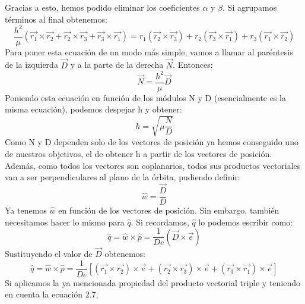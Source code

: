 \documentclass{article}
\numberwithin{equation}{section}
\begin{document}
Gracias a esto, hemos podido eliminar los coeficientes 
$\alpha$ y $\beta$. Si agrupamos términos al final obtenemos: 
\begin{equation*}
    \frac{h^{2}}{\mu}(\overrightarrow{r_{1}}\times\overrightarrow{r_{2}}+\overrightarrow{r_{2}}\times\overrightarrow{r_{3}}+\overrightarrow{r_{3}}\times\overrightarrow{r_{1}})=r_{1}(\overrightarrow{r_{2}}\times\overrightarrow{r_{3}})+r_{2}(\overrightarrow{r_{3}}\times\overrightarrow{r_{1}})+r_{3}(\overrightarrow{r_{1}}\times\overrightarrow{r_{2}}) 
\end{equation*}
Para poner esta ecuación de un modo más simple, vamos a llamar 
al paréntesis de la izquierda $\overrightarrow{D}$ y a la 
parte de la derecha $\overrightarrow{N}$. Entonces: 
\begin{equation}
    \overrightarrow{N}=\frac{h^{2}}{\mu}\overrightarrow{D} 
\end{equation}
Poniendo esta ecuación en función de los módulos N y D (esencialmente 
es la misma ecuación), podemos despejar h y obtener: 
\begin{equation}
    h=\sqrt{\mu\frac{N}{D}}
\end{equation}
Como N y D dependen solo de los vectores de posición ya hemos 
conseguido uno de nuestros objetivos, el de obtener h a partir 
de los vectores de posición. Además, como todos los vectores son  coplanarios, todos sus productos vectoriales van a ser perpendiculares  al plano de la órbita, pudiendo definir: 
\begin{equation}
    \hat{w}=\frac{\overrightarrow{D}}{D} 
\end{equation}
Ya tenemos $\hat{w}$ en función de los vectores de posición. Sin 
embargo, también necesitamos hacer lo mismo para $\hat{q}$.
Si recordamos, $\hat{q}$ lo podemos escribir como: 
\begin{equation*}
    \hat{q}=\hat{w}\times\hat{p}=\frac{1}{De}(\overrightarrow{D}\times\overrightarrow{e}) 
\end{equation*}
Sustituyendo el valor de $\overrightarrow{D}$ obtenemos: 
\begin{equation*}
    \hat{q}=\hat{w}\times\hat{p}=\frac{1}{De}[(\overrightarrow{r_{1}}\times\overrightarrow{r_{2}})\times\overrightarrow{e}+(\overrightarrow{r_{2}}\times\overrightarrow{r_{3}})\times\overrightarrow{e}+(\overrightarrow{r_{3}}\times\overrightarrow{r_{1}})\times\overrightarrow{e}]
\end{equation*}
Si aplicamos la ya mencionada propiedad del producto 
vectorial triple y teniendo en cuenta la ecuación 2.7, 
\end{document}
